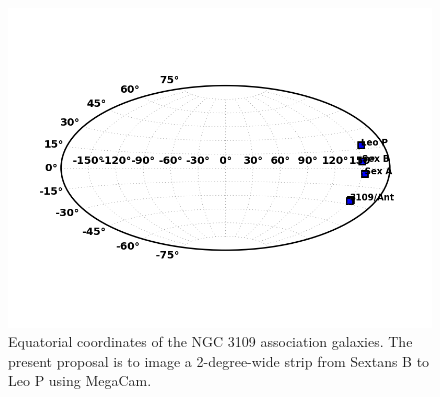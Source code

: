 \begin{figure}
\caption{Equatorial coordinates of the NGC 3109 association galaxies. The present proposal is to image
a 2-degree-wide strip from Sextans B to Leo P using MegaCam.}
\includegraphics[scale=0.7]{n3109_group_sky}

\end{figure}


